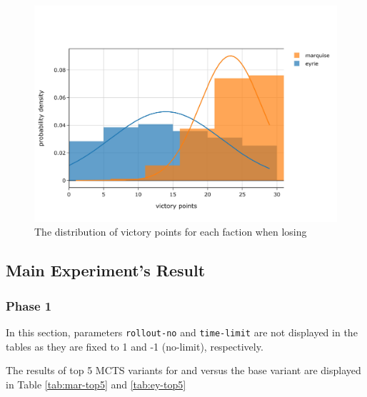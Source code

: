 \begin{figure}[h!]
    \begin{center}
      \includegraphics[width=\textwidth]{./images/fig-introductory-loser-vp-dist.jpeg}
    \end{center}
    \caption{The distribution of victory points for each faction when losing}
    \label{fig:introductory-loser-vp-dist}
\end{figure}

\subsection{Main Experiment's Result}

\subsubsection{Phase 1}


In this section, parameters \texttt{rollout-no} and \texttt{time-limit} are not displayed in the tables as they are fixed to 1 and -1 (no-limit), respectively.

The results of top 5 MCTS variants for \Marquise{} and \Eyrie{} versus the base variant are displayed in Table \ref{tab:mar-top5} and \ref{tab:ey-top5}


